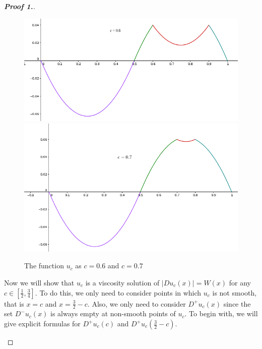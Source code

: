 \documentclass[12pt, oneside]{amsart}  	%
\begin{document}
\begin{proof}[\textbf{Proof 1.}]
\begin{itemize}
\begin{figure}[h]
\begin{center}
\; \includegraphics[scale=0.3]{exe2b}\quad
\includegraphics[scale=0.3]{exe2a}
\end{center}
\caption{The function $u_c$ as $c = 0.6$ and $c = 0.7$}
\end{figure}
\FloatBarrier


Now we will show that $u_c$ is a viscosity solution of $|Du_c(x)| = W(x)$ for any $c\in \left[\frac{1}{2},\frac{3}{4}\right]$. To do this, we only need to consider points in which $u_c$ is not smooth, that is $x = c$ and $x = \frac{3}{2} - c$. Also, we only need to consider $D^+u_c(x)$ since the set $D^-u_c(x)$ is always empty at non-smooth points of $u_c$. To begin with, we will give explicit formulas for $D^+u_c(c)$ and $D^+u_c\left(\frac{3}{2} - c\right)$.\\


\end{itemize}
\end{proof}
\end{document}
